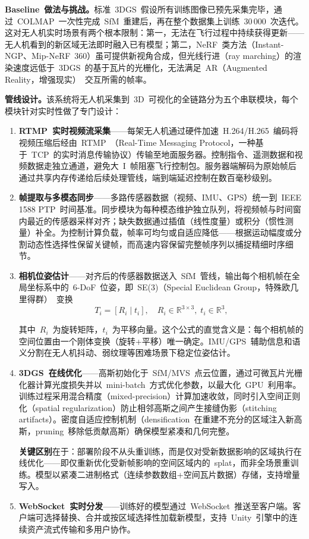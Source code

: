 \textbf{Baseline~做法与挑战。}标准~3DGS~假设所有训练图像已预先采集完毕，通过~COLMAP~一次性完成~SfM~重建后，再在整个数据集上训练~30\,000~次迭代。这对无人机实时场景有两个根本限制：第一，无法在飞行过程中持续获得更新——无人机看到的新区域无法即时融入已有模型；第二，NeRF~类方法（Instant-NGP、Mip-NeRF~360）虽可提供新视角合成，但光线行进（ray marching）的渲染速度远低于~3DGS~的基于瓦片的光栅化，无法满足~AR（Augmented Reality，增强现实）~交互所需的帧率。

\textbf{管线设计。}该系统将无人机采集到~3D~可视化的全链路分为五个串联模块，每个模块针对实时性做了专门设计：

\begin{enumerate}
\item \textbf{RTMP~实时视频流采集}——每架无人机通过硬件加速~H.264/H.265~编码将视频压缩后经由~RTMP~（Real-Time Messaging Protocol，一种基于~TCP~的实时消息传输协议）传输至地面服务器。控制指令、遥测数据和视频数据走独立通道，避免大~I~帧阻塞飞行控制包。服务器端解码为原始帧后通过共享内存传递给后续处理管线，端到端延迟控制在数百毫秒级别。
\item \textbf{帧提取与多模态同步}——多路传感器数据（视频、IMU、GPS）统一到~IEEE 1588 PTP~时间基准。同步模块为每种模态维护独立队列，将视频帧与时间窗内最近的传感器采样对齐；缺失数据通过插值（线性度量）或积分（惯性测量）补全。为控制计算负载，帧率可均匀或自适应降低——根据运动幅度或分割动态性选择性保留关键帧，而高速内容保留完整帧序列以捕捉精细时序细节。
\item \textbf{相机位姿估计}——对齐后的传感器数据送入~SfM~管线，输出每个相机帧在全局坐标系中的~6-DoF~位姿，即~SE(3)（Special Euclidean Group，特殊欧几里得群）~变换
\begin{equation}
T_i = [R_i \mid t_i], \quad R_i \in \mathbb{R}^{3\times3},\; t_i \in \mathbb{R}^3,
\end{equation}

其中~$R_i$~为旋转矩阵，$t_i$~为平移向量。这个公式的直觉含义是：每个相机帧的空间位置由一个刚体变换（旋转+平移）唯一确定。IMU/GPS~辅助信息和语义分割在无人机抖动、弱纹理等困难场景下稳定位姿估计。
\item \textbf{3DGS~在线优化}——高斯初始化于~SfM/MVS~点云位置，通过可微瓦片光栅化器计算光度损失并以~mini-batch~方式优化参数，以最大化~GPU~利用率。训练过程采用混合精度（mixed-precision）计算加速收敛，同时引入空间正则化（spatial regularization）防止相邻高斯之间产生接缝伪影（stitching artifacts）。密度自适应控制机制（densification~在重建不充分的区域注入新高斯，pruning~移除低贡献高斯）确保模型紧凑和几何完整。

\textbf{关键区别}在于：部署阶段不从头重训练，而是仅对受新数据影响的区域执行在线优化——即仅重新优化受新帧影响的空间区域内的~splat，而非全场景重训练。模型以紧凑二进制格式（连续参数数组+空间瓦片数据）存储，支持增量写入。
\item \textbf{WebSocket~实时分发}——训练好的模型通过~WebSocket~推送至客户端。客户端可选择替换、合并或按区域选择性加载新模型，支持~Unity~引擎中的连续资产流式传输和多用户协作。
\end{enumerate}

